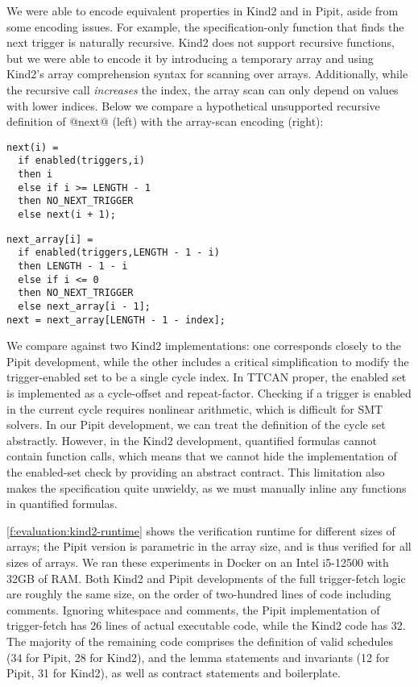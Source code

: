We were able to encode equivalent properties in Kind2 and in Pipit, aside from some encoding issues.
For example, the specification-only function that finds the next trigger is naturally recursive.
Kind2 does not support recursive functions, but we were able to encode it by introducing a temporary array and using Kind2's array comprehension syntax for scanning over arrays.
Additionally, while the recursive call \emph{increases} the index, the array scan can only depend on values with lower indices.
Below we compare a hypothetical unsupported recursive definition of @next@ (left) with the array-scan encoding (right):

\begin{minipage}{0.4\textwidth}
\begin{verbatim}
next(i) =
  if enabled(triggers,i)
  then i
  else if i >= LENGTH - 1
  then NO_NEXT_TRIGGER
  else next(i + 1);

\end{verbatim}
\end{minipage}
\begin{minipage}{0.55\textwidth}
\begin{verbatim}
next_array[i] =
  if enabled(triggers,LENGTH - 1 - i)
  then LENGTH - 1 - i
  else if i <= 0
  then NO_NEXT_TRIGGER
  else next_array[i - 1];
next = next_array[LENGTH - 1 - index];

\end{verbatim}
\end{minipage}

We compare against two Kind2 implementations: one corresponds closely to the Pipit development, while the other includes a critical simplification to modify the trigger-enabled set to be a single cycle index.
In TTCAN proper, the enabled set is implemented as a cycle-offset and repeat-factor.
Checking if a trigger is enabled in the current cycle requires nonlinear arithmetic, which is difficult for SMT solvers.
In our Pipit development, we can treat the definition of the cycle set abstractly.
However, in the Kind2 development, quantified formulas cannot contain function calls, which means that we cannot hide the implementation of the enabled-set check by providing an abstract contract.
This limitation also makes the specification quite unwieldy, as we must manually inline any functions in quantified formulas.

\autoref{f:evaluation:kind2-runtime} shows the verification runtime for different sizes of arrays; the Pipit version is parametric in the array size, and is thus verified for all sizes of arrays.
We ran these experiments in Docker on an Intel i5-12500 with 32GB of RAM.
Both Kind2 and Pipit developments of the full trigger-fetch logic are roughly the same size, on the order of two-hundred lines of code including comments.
Ignoring whitespace and comments, the Pipit implementation of trigger-fetch has 26 lines of actual executable code, while the Kind2 code has 32.
The majority of the remaining code comprises the definition of valid schedules (34 for Pipit, 28 for Kind2), and the lemma statements and invariants (12 for Pipit, 31 for Kind2), as well as contract statements and boilerplate.

